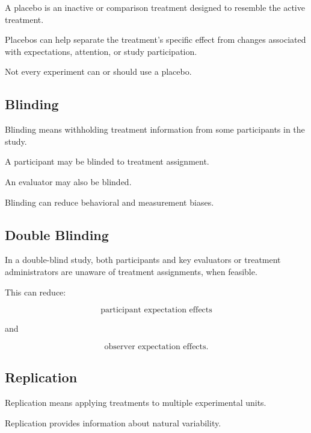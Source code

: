 A placebo is an inactive or comparison treatment designed to resemble
the active treatment.

Placebos can help separate the treatment's specific effect from changes
associated with expectations, attention, or study participation.

Not every experiment can or should use a placebo.

\subsection{Blinding}
\label{subsec:blinding}

Blinding means withholding treatment information from some participants
in the study.

A participant may be blinded to treatment assignment.

An evaluator may also be blinded.

Blinding can reduce behavioral and measurement biases.

\subsection{Double Blinding}
\label{subsec:double-blinding}

In a double-blind study, both participants and key evaluators or
treatment administrators are unaware of treatment assignments, when
feasible.

This can reduce:

\[
\boxed{
\text{participant expectation effects}
}
\]

and

\[
\boxed{
\text{observer expectation effects}.
}
\]

\subsection{Replication}
\label{subsec:replication}

Replication means applying treatments to multiple experimental units.

Replication provides information about natural variability.

